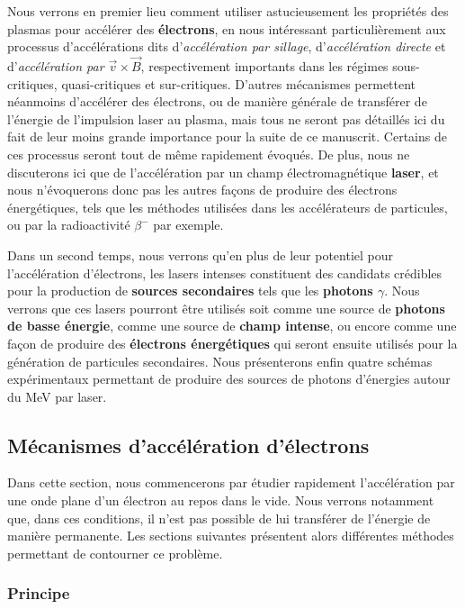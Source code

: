 \begin{refsection}
Nous verrons en premier lieu comment utiliser astucieusement les propriétés des plasmas pour accélérer des \textbf{électrons}, en nous intéressant particulièrement aux processus d'accélérations dits d'\textit{accélération par sillage}, d'\textit{accélération directe} et d'\textit{accélération par $\vec{v} \times \vec{B}$}, respectivement importants dans les régimes sous-critiques, quasi-critiques et sur-critiques. D'autres mécanismes permettent néanmoins d'accélérer des électrons, ou de manière générale de transférer de l'énergie de l'impulsion laser au plasma, mais tous ne seront pas détaillés ici du fait de leur moins grande importance pour la suite de ce manuscrit. Certains de ces processus seront tout de même rapidement évoqués. De plus, nous ne discuterons ici que de l'accélération par un champ électromagnétique \textbf{laser}, et nous n'évoquerons donc pas les autres façons de produire des électrons énergétiques, tels que les méthodes utilisées dans les accélérateurs de particules, ou par la radioactivité $\beta^-$ par exemple.

Dans un second temps, nous verrons qu'en plus de leur potentiel pour l'accélération d'électrons, les lasers intenses constituent des candidats crédibles pour la production de \textbf{sources secondaires} tels que les \textbf{photons $\gamma$}. Nous verrons que ces lasers pourront être utilisés soit comme une source de \textbf{photons de basse énergie}, comme une source de \textbf{champ intense}, ou encore comme une façon de produire des \textbf{électrons énergétiques} qui seront ensuite utilisés pour la génération de particules secondaires. Nous présenterons enfin quatre schémas expérimentaux permettant de produire des sources de photons d'énergies autour du MeV par laser.


\subsection{Mécanismes d'accélération d'électrons}

Dans cette section, nous commencerons par étudier rapidement l'accélération par une onde plane d'un électron au repos dans le vide. Nous verrons notamment que, dans ces conditions, il n'est pas possible de lui transférer de l'énergie de manière permanente. Les sections suivantes présentent alors différentes méthodes permettant de contourner ce problème.

\subsubsection{Principe}


\end{refsection}
